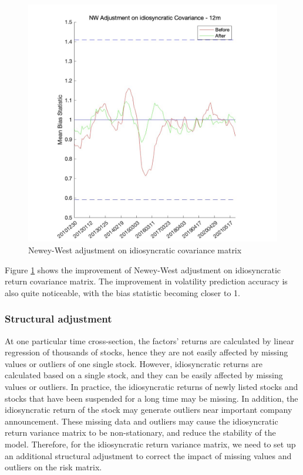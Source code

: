 \documentclass[10pt]{article}
\begin{document}
\begin{figure}[H]
    \centering
    \includegraphics[height=0.8\textwidth]{NW on idio.png}
    \caption{Newey-West adjustment on idiosyncratic covariance matrix}
    \label{fig:NW on idio}
\end{figure}
Figure \ref{fig:NW on idio} shows the improvement of Newey-West adjustment on idiosyncratic return covariance matrix. The improvement in volatility prediction accuracy is also quite noticeable, with the bias statistic becoming closer to 1.
\subsubsection{Structural adjustment}

At one particular time cross-section, the factors' returns are calculated by linear regression of thousands of stocks, hence they are not easily affected by missing values or outliers of one single stock. However, idiosyncratic returns are calculated based on a single stock, and they can be easily affected by missing values or outliers. In practice, the idiosyncratic returns of newly listed stocks and stocks that have been suspended for a long time may be missing. In addition, the idiosyncratic return of the stock may generate outliers near important company announcement. These missing data and outliers may cause the idiosyncratic return variance matrix to be non-stationary, and reduce the stability of the model.
Therefore, for the idiosyncratic return variance matrix, we need to set up an additional structural adjustment to correct the impact of  missing values and outliers on the risk matrix.
\end{document}
